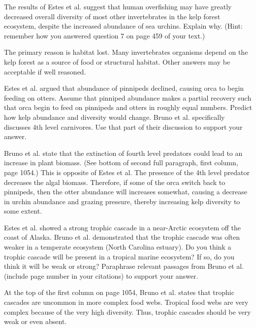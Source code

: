 \documentclass[11pt, addpoints]{exam}
\begin{document}
\begin{questions}
\question[5]
The results of Estes et al. suggest that human overfishing may have greatly decreased overall diversity of most other invertebrates in the kelp forest ecosystem, despite the increased abundance of sea urchins. Explain why. (Hint: remember how you answered question 7 on page 459 of your text.)
\begin{solution}
The primary reason is habitat lost. Many invertebrates organisms depend on the kelp forest as a source of food or structural habitat. Other answers may be acceptable if well reasoned.
\end{solution}

\question[8]
Estes et al. argued that abundance of pinnipeds declined, causing orca to begin feeding on otters. Assume that pinniped abundance makes a partial recovery such that orca begin to feed on pinnipeds and otters in roughly equal numbers. Predict how kelp abundance and diversity would change.  Bruno et al. specifically discusses 4th level carnivores.  Use that part of their discussion to support your answer. 

\begin{solution}
Bruno et al. state that the extinction of fourth level predators could lead to an increase in plant biomass.  (See bottom of second full paragraph, first column, page 1054.) This is opposite of Estes et al. The presence of the 4th level predator decreases the algal biomass. Therefore, if some of the orca switch back to pinnipeds, then the otter abundance will increases somewhat, causing a decrease in urchin abundance and grazing pressure, thereby increasing kelp diversity to some extent.
\end{solution}

\question[8]
Estes et al. showed a strong trophic cascade in a near-Arctic ecosystem off the coast of Alaska.  Bruno et al. demonstrated that the trophic cascade was often weaker in a temperate ecosystem (North Carolina estuary). Do you think a trophic cascade will be present in a tropical marine ecosystem? If so, do you think it will be weak or strong? Paraphrase relevant passages from Bruno et al. (include page number in your citations) to support your answer.

\begin{solution}
At the top of the first column on page 1054, Bruno et al. states that trophic cascades are uncommon in more complex food webs. Tropical food webs are very complex because of the very high diversity. Thus, trophic cascades should be very weak or even absent. 
\end{solution}

\end{questions}
\end{document}
